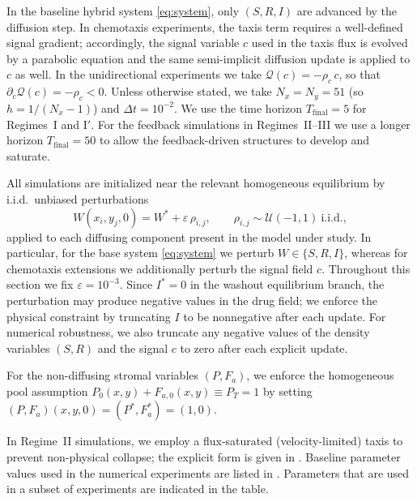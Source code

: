 \documentclass[pdflatex,sn-mathphys-ay]{sn-jnl}
\theoremstyle{thmstyleone}
\theoremstyle{definition}
\theoremstyle{remark}
\begin{document}
In the baseline hybrid system \eqref{eq:system}, only $(S,R,I)$ are advanced by the diffusion step. 
In chemotaxis experiments, the taxis term requires a well-defined signal gradient; 
accordingly, the signal variable $c$ used in the taxis flux is evolved by a parabolic equation and the same semi-implicit diffusion update is applied to $c$ as well. 
In the unidirectional experiments we take $\mathcal Q(c)=-\rho_c\,c$, so that $\partial_c\mathcal Q(c)=-\rho_c<0$.
Unless otherwise stated, we take $N_x=N_y=51$ (so $h=1/(N_x-1)$) and $\Delta t=10^{-2}$. 
We use the time horizon $T_{\mathrm{final}}=5$ for Regimes~I and I$'$. 
For the feedback simulations in Regimes~II--III we use a longer horizon $T_{\mathrm{final}}=50$ to allow the feedback-driven structures to develop and saturate.

All simulations are initialized near the relevant homogeneous equilibrium by i.i.d.\ unbiased perturbations
\[
W(x_i,y_j,0)=W^*+\varepsilon\,\rho_{i,j},
\qquad 
\rho_{i,j}\sim\mathcal{U}(-1,1)\ \text{i.i.d.},
\]
applied to each diffusing component present in the model under study.
In particular, for the base system \eqref{eq:system} we perturb $W\in \{S,R,I\}$, 
whereas for chemotaxis extensions we additionally perturb the signal field $c$.
Throughout this section we fix $\varepsilon=10^{-3}$. 
Since $I^*=0$ in the washout equilibrium branch, the perturbation may produce negative values in the drug field; we enforce the physical constraint by truncating $I$ to be nonnegative after each update. 
For numerical robustness, we also truncate any negative values of the density variables $(S,R)$ and the signal $c$ to zero after each explicit update.

For the non-diffusing stromal variables $(P,F_a)$, we enforce the homogeneous pool assumption $P_0(x,y)+F_{a,0}(x,y)\equiv P_T=1$ by setting $(P,F_a)(x,y,0)=(P^*,F_a^*)=(1,0)$.

In Regime~II simulations, we employ a flux-saturated (velocity-limited) taxis to prevent non-physical collapse; the explicit form is given in . 
Baseline parameter values used in the numerical experiments are listed in . Parameters that are used in a subset of experiments are indicated in the table.
\end{document}
